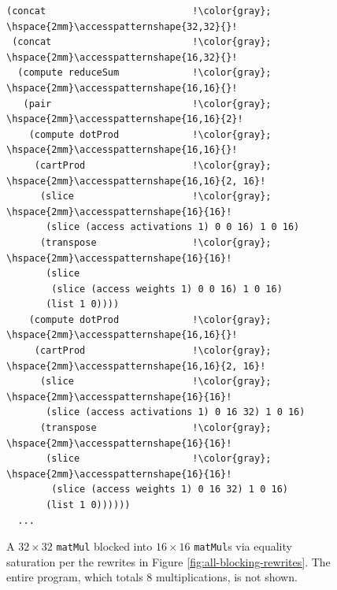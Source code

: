 \documentclass[prologue, dvipsnames, sigplan, screen, review, anonymous]{acmart}
\newcommand{\accesspatternshape}[2]{$($$\left( #1 \right)$, $\left( #2 \right)$$)$}
\begin{document}
\begin{figure}
\begin{lstlisting}[escapechar=!]
(concat                          !\color{gray}; \hspace{2mm}\accesspatternshape{32,32}{}!
 (concat                         !\color{gray}; \hspace{2mm}\accesspatternshape{16,32}{}!
  (compute reduceSum             !\color{gray}; \hspace{2mm}\accesspatternshape{16,16}{}!
   (pair                         !\color{gray}; \hspace{2mm}\accesspatternshape{16,16}{2}!
    (compute dotProd             !\color{gray}; \hspace{2mm}\accesspatternshape{16,16}{}!
     (cartProd                   !\color{gray}; \hspace{2mm}\accesspatternshape{16,16}{2, 16}!
      (slice                     !\color{gray}; \hspace{2mm}\accesspatternshape{16}{16}!
       (slice (access activations 1) 0 0 16) 1 0 16)
      (transpose                 !\color{gray}; \hspace{2mm}\accesspatternshape{16}{16}!
       (slice 
        (slice (access weights 1) 0 0 16) 1 0 16)
       (list 1 0))))
    (compute dotProd             !\color{gray}; \hspace{2mm}\accesspatternshape{16,16}{}!
     (cartProd                   !\color{gray}; \hspace{2mm}\accesspatternshape{16,16}{2, 16}!
      (slice                     !\color{gray}; \hspace{2mm}\accesspatternshape{16}{16}!
       (slice (access activations 1) 0 16 32) 1 0 16)
      (transpose                 !\color{gray}; \hspace{2mm}\accesspatternshape{16}{16}!
       (slice                    !\color{gray}; \hspace{2mm}\accesspatternshape{16}{16}!
        (slice (access weights 1) 0 16 32) 1 0 16)
       (list 1 0))))))
  ...
  \end{lstlisting}
  \vspace{-2em}
  \caption{A $32\times32$ \texttt{matMul}
  blocked into $16\times16$ \texttt{matMul}s
   via equality saturation per the rewrites in Figure
   \ref{fig:all-blocking-rewrites}.
  The entire program, which totals 8 multiplications, is not shown.
  }
  \label{fig:matmul-rewritten}
  \vspace{-1em}
\end{figure}
\end{document}
